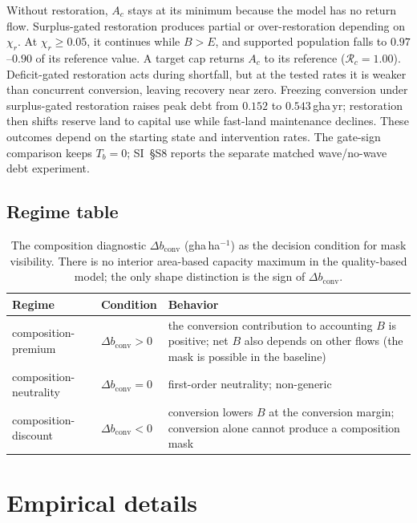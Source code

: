 \documentclass[11pt,a4paper]{article}
\newcommand{\dconv}{\Delta b_{\mathrm{conv}}}
\begin{document}
Without restoration, $A_c$ stays at its minimum because the model has no return flow. Surplus-gated restoration produces partial or over-restoration depending on $\chi_r$. At $\chi_r\ge0.05$, it continues while $B>E$, and supported population falls to $0.97$--$0.90$ of its reference value. A target cap returns $A_c$ to its reference ($\mathcal R_c=1.00$). Deficit-gated restoration acts during shortfall, but at the tested rates it is weaker than concurrent conversion, leaving recovery near zero. Freezing conversion under surplus-gated restoration raises peak debt from $0.152$ to $0.543$\,gha\,yr; restoration then shifts reserve land to capital use while fast-land maintenance declines. These outcomes depend on the starting state and intervention rates. The gate-sign comparison keeps $T_b=0$; SI~\S S8 reports the separate matched wave/no-wave debt experiment.\par

\subsection{Regime table}\label{si:regimes}

\begin{table}[H]
\centering\small
\caption{The composition diagnostic $\dconv$ (gha\,ha$^{-1}$) as the decision condition for mask visibility. There is no interior area-based capacity maximum in the quality-based model; the only shape distinction is the sign of $\dconv$.}
\label{tab:si_regime}
\begin{tabularx}{\textwidth}{l l X}
\toprule
Regime & Condition & Behavior \\
\midrule
composition-premium & $\dconv>0$ & the conversion contribution to accounting $B$ is positive; net $B$ also depends on other flows (the mask is possible in the baseline) \\
composition-neutrality & $\dconv=0$ & first-order neutrality; non-generic \\
composition-discount & $\dconv<0$ & conversion lowers $B$ at the conversion margin; conversion alone cannot produce a composition mask \\
\bottomrule
\end{tabularx}
\end{table}

\section{Empirical details}\label{si:empirical}
\end{document}
